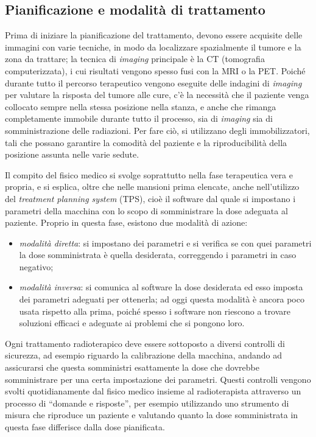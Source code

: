 \documentclass{report}
\newcommand{\virgolette}[1]{``#1''}
\numberwithin{equation}{section}
\numberwithin{figure}{section}
\begin{document}
\subsection{Pianificazione e modalità di trattamento}\label{4.4.2}
Prima di iniziare la pianificazione del trattamento, devono essere acquisite delle immagini con varie tecniche, in modo da localizzare spazialmente il tumore e la zona da trattare; la tecnica di \textit{imaging} principale è la CT (tomografia computerizzata), i cui risultati vengono spesso fusi con la MRI o la PET. Poiché durante tutto il percorso terapeutico vengono eseguite delle indagini di \textit{imaging} per valutare la risposta del tumore alle cure, c'è la necessità che il paziente venga collocato sempre nella stessa posizione nella stanza, e anche che rimanga completamente immobile durante tutto il processo, sia di \textit{imaging} sia di somministrazione delle radiazioni. Per fare ciò, si utilizzano degli immobilizzatori, tali che possano garantire la comodità del paziente e la riproducibilità della posizione assunta nelle varie sedute.

Il compito del fisico medico si svolge soprattutto nella fase terapeutica vera e propria, e si esplica, oltre che nelle mansioni prima elencate, anche nell'utilizzo del \textit{treatment planning system} (TPS), cioè il software dal quale si impostano i parametri della macchina con lo scopo di somministrare la dose adeguata al paziente. Proprio in questa fase, esistono due modalità di azione:
\begin{itemize}[label=$-$]
    \item \emph{modalità diretta}: si impostano dei parametri e si verifica se con quei parametri la dose somministrata è quella desiderata, correggendo i parametri in caso negativo;
    \item \emph{modalità inversa}: si comunica al software la dose desiderata ed esso imposta dei parametri adeguati per ottenerla; ad oggi questa modalità è ancora poco usata rispetto alla prima, poiché spesso i software non riescono a trovare soluzioni efficaci e adeguate ai problemi che si pongono loro.
\end{itemize}
Ogni trattamento radioterapico deve essere sottoposto a diversi controlli di sicurezza, ad esempio riguardo la calibrazione della macchina, andando ad assicurarsi che questa somministri esattamente la dose che dovrebbe somministrare per una certa impostazione dei parametri. Questi controlli vengono svolti quotidianamente dal fisico medico insieme al radioterapista attraverso un processo di \virgolette{domande e risposte}, per esempio utilizzando uno strumento di misura che riproduce un paziente e valutando quanto la dose somministrata in questa fase differisce dalla dose pianificata.
\end{document}
